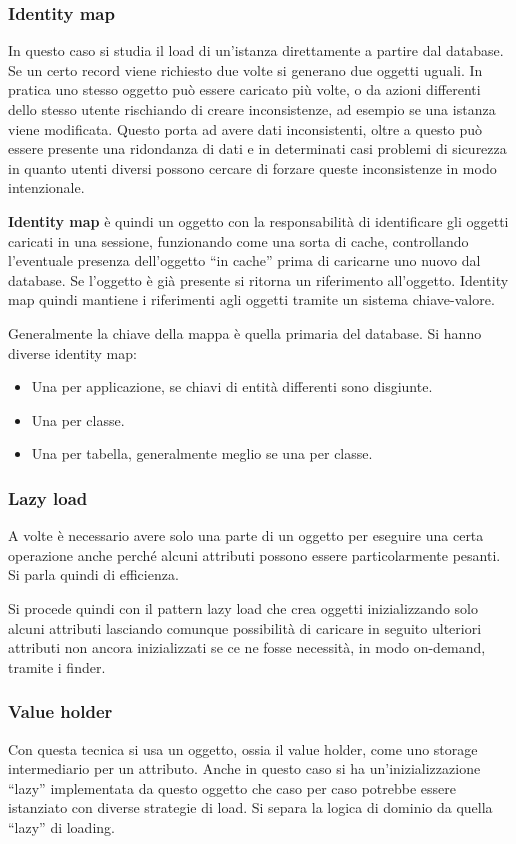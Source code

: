 \subsubsection{Identity map}
In questo caso si studia il load di un'istanza direttamente a partire dal database.
Se un certo record viene richiesto due volte si generano due oggetti uguali.
In pratica uno stesso oggetto può essere caricato più volte, o da azioni differenti
dello stesso utente rischiando di creare inconsistenze, ad esempio se una istanza
viene modificata. Questo porta ad avere dati inconsistenti, oltre a questo può
essere presente una ridondanza di dati e in determinati casi problemi di
sicurezza in quanto utenti diversi possono cercare di forzare queste
inconsistenze in modo intenzionale.

\textbf{Identity map} è quindi un oggetto con la responsabilità di identificare
gli oggetti caricati in una sessione, funzionando come una sorta di cache,
controllando l'eventuale presenza dell'oggetto “in cache” prima di caricarne uno
nuovo dal database. Se l'oggetto è già presente si ritorna un riferimento
all'oggetto. Identity map quindi mantiene i riferimenti agli oggetti tramite un
sistema chiave-valore.

Generalmente la chiave della mappa è quella primaria del database. Si hanno
diverse identity map:
\begin{itemize}
      \item Una per applicazione, se chiavi di entità differenti sono disgiunte.
      \item Una per classe.
      \item Una per tabella, generalmente meglio se una per classe.
\end{itemize}
\subsubsection{Lazy load}
A volte è necessario avere solo una parte di un oggetto per eseguire una certa
operazione anche perché alcuni attributi possono essere particolarmente pesanti.
Si parla quindi di efficienza.

Si procede quindi con il pattern lazy load che crea oggetti inizializzando solo
alcuni attributi lasciando comunque possibilità di caricare in seguito ulteriori
attributi non ancora inizializzati se ce ne fosse necessità, in modo on-demand,
tramite i finder.
\subsubsection{Value holder}
Con questa tecnica si usa un oggetto, ossia il value holder, come uno storage
intermediario per un attributo. Anche in questo caso si ha un'inizializzazione
“lazy” implementata da questo oggetto che caso per caso potrebbe essere istanziato
con diverse strategie di load. Si separa la logica di dominio da quella “lazy”
di loading.
